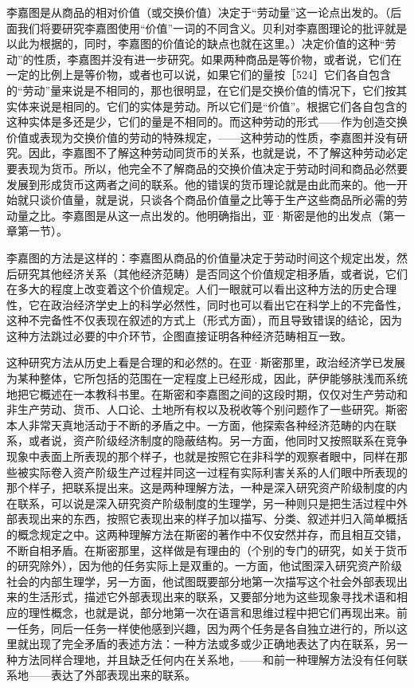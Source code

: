 
李嘉图是从商品的相对价值（或交换价值）决定于“劳动量”这一论点出发的。（后面我们将要研究李嘉图使用“价值”一词的不同含义。贝利对李嘉图理论的批评就是以此为根据的，同时，李嘉图的价值论的缺点也就在这里。）决定价值的这种“劳动”的性质，李嘉图并没有进一步研究。如果两种商品是等价物，或者说，它们在一定的比例上是等价物，或者也可以说，如果它们的量按［524］它们各自包含的“劳动”量来说是不相同的，那也很明显，在它们是交换价值的情况下，它们按其实体来说是相同的。它们的实体是劳动。所以它们是“价值”。根据它们各自包含的这种实体是多还是少，它们的量是不相同的。而这种劳动的形式——作为创造交换价值或表现为交换价值的劳动的特殊规定，——这种劳动的性质，李嘉图并没有研究。因此，李嘉图不了解这种劳动同货币的关系，也就是说，不了解这种劳动必定要表现为货币。所以，他完全不了解商品的交换价值决定于劳动时间和商品必然要发展到形成货币这两者之间的联系。他的错误的货币理论就是由此而来的。他一开始就只谈价值量，就是说，只谈各个商品价值量之比等于生产这些商品所必需的劳动量之比。李嘉图是从这一点出发的。他明确指出，亚·斯密是他的出发点（第一章第一节）。

李嘉图的方法是这样的：李嘉图从商品的价值量决定于劳动时间这个规定出发，然后研究其他经济关系（其他经济范畴）是否同这个价值规定相矛盾，或者说，它们在多大的程度上改变着这个价值规定。人们一眼就可以看出这种方法的历史合理性，它在政治经济学史上的科学必然性，同时也可以看出它在科学上的不完备性，这种不完备性不仅表现在叙述的方式上（形式方面），而且导致错误的结论，因为这种方法跳过必要的中介环节，企图直接证明各种经济范畴相互一致。

这种研究方法从历史上看是合理的和必然的。在亚·斯密那里，政治经济学已发展为某种整体，它所包括的范围在一定程度上已经形成，因此，萨伊能够肤浅而系统地把它概述在一本教科书里。在斯密和李嘉图之间的这段时期，仅仅对生产劳动和非生产劳动、货币、人口论、土地所有权以及税收等个别问题作了一些研究。斯密本人非常天真地活动于不断的矛盾之中。一方面，他探索各种经济范畴的内在联系，或者说，资产阶级经济制度的隐蔽结构。另一方面，他同时又按照联系在竞争现象中表面上所表现的那个样子，也就是按照它在非科学的观察者眼中，同样在那些被实际卷入资产阶级生产过程并同这一过程有实际利害关系的人们眼中所表现的那个样子，把联系提出来。这是两种理解方法，一种是深入研究资产阶级制度的内在联系，可以说是深入研究资产阶级制度的生理学，另一种则只是把生活过程中外部表现出来的东西，按照它表现出来的样子加以描写、分类、叙述并归入简单概括的概念规定之中。这两种理解方法在斯密的著作中不仅安然并存，而且相互交错，不断自相矛盾。在斯密那里，这样做是有理由的（个别的专门的研究，如关于货币的研究除外），因为他的任务实际上是双重的。一方面，他试图深入研究资产阶级社会的内部生理学，另一方面，他试图既要部分地第一次描写这个社会外部表现出来的生活形式，描述它外部表现出来的联系，又要部分地为这些现象寻找术语和相应的理性概念，也就是说，部分地第一次在语言和思维过程中把它们再现出来。前一任务，同后一任务一样使他感到兴趣，因为两个任务是各自独立进行的，所以这里就出现了完全矛盾的表述方法：一种方法或多或少正确地表达了内在联系，另一种方法同样合理地，并且缺乏任何内在关系地，——和前一种理解方法没有任何联系地——表达了外部表现出来的联系。

